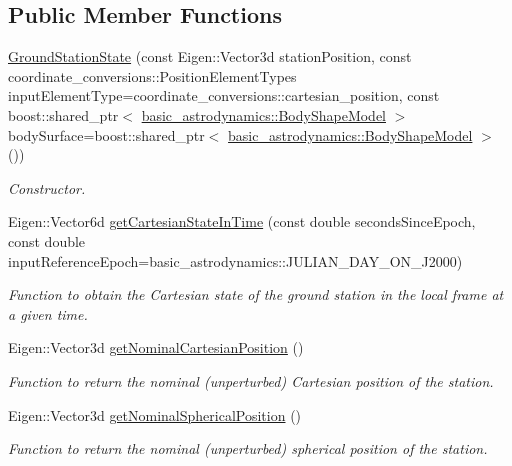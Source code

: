 \subsection*{Public Member Functions}
\begin{DoxyCompactItemize}
\item 
\hyperlink{classtudat_1_1ground__stations_1_1GroundStationState_ac633824ae9fa6c8a1a8cdc3e1309c35d}{Ground\+Station\+State} (const Eigen\+::\+Vector3d station\+Position, const coordinate\+\_\+conversions\+::\+Position\+Element\+Types input\+Element\+Type=coordinate\+\_\+conversions\+::cartesian\+\_\+position, const boost\+::shared\+\_\+ptr$<$ \hyperlink{classtudat_1_1basic__astrodynamics_1_1BodyShapeModel}{basic\+\_\+astrodynamics\+::\+Body\+Shape\+Model} $>$ body\+Surface=boost\+::shared\+\_\+ptr$<$ \hyperlink{classtudat_1_1basic__astrodynamics_1_1BodyShapeModel}{basic\+\_\+astrodynamics\+::\+Body\+Shape\+Model} $>$())
\begin{DoxyCompactList}\small\item\em Constructor. \end{DoxyCompactList}\item 
Eigen\+::\+Vector6d \hyperlink{classtudat_1_1ground__stations_1_1GroundStationState_a852d6bf1c17c7228b738ba792eeaf40d}{get\+Cartesian\+State\+In\+Time} (const double seconds\+Since\+Epoch, const double input\+Reference\+Epoch=basic\+\_\+astrodynamics\+::\+J\+U\+L\+I\+A\+N\+\_\+\+D\+A\+Y\+\_\+\+O\+N\+\_\+\+J2000)
\begin{DoxyCompactList}\small\item\em Function to obtain the Cartesian state of the ground station in the local frame at a given time. \end{DoxyCompactList}\item 
Eigen\+::\+Vector3d \hyperlink{classtudat_1_1ground__stations_1_1GroundStationState_a9aa8bfcfa00107b8727ff9cacff2ca52}{get\+Nominal\+Cartesian\+Position} ()
\begin{DoxyCompactList}\small\item\em Function to return the nominal (unperturbed) Cartesian position of the station. \end{DoxyCompactList}\item 
Eigen\+::\+Vector3d \hyperlink{classtudat_1_1ground__stations_1_1GroundStationState_acc884d85ea5331749bc7ac6bec9b0b7c}{get\+Nominal\+Spherical\+Position} ()
\begin{DoxyCompactList}\small\item\em Function to return the nominal (unperturbed) spherical position of the station. \end{DoxyCompactList}\item 

\end{DoxyCompactItemize}

